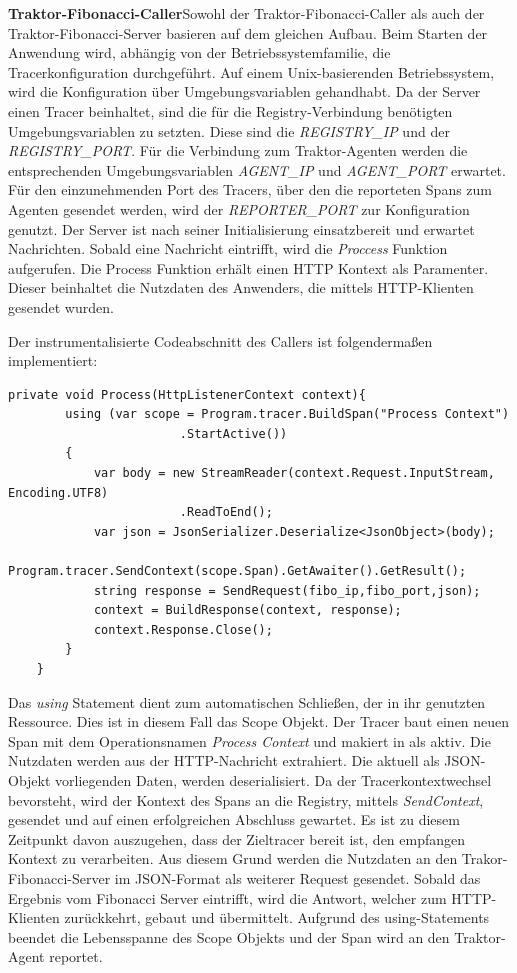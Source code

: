 \textbf{Traktor-Fibonacci-Caller}\space\space\space Sowohl der Traktor-Fibonacci-Caller als auch der Traktor-Fibonacci-Server basieren auf dem gleichen Aufbau. Beim Starten der Anwendung wird, abhängig von der Betriebssystemfamilie, die Tracerkonfiguration durchgeführt. 
Auf einem Unix-basierenden Betriebssystem, wird die Konfiguration über Umgebungsvariablen gehandhabt. 
Da der Server einen Tracer beinhaltet, sind die für die Registry-Verbindung benötigten Umgebungsvariablen zu setzten. 
Diese sind die \emph{REGISTRY\_IP} und der \emph{REGISTRY\_PORT}. 
Für die Verbindung zum Traktor-Agenten werden die entsprechenden Umgebungsvariablen \emph{AGENT\_IP} und \emph{AGENT\_PORT} erwartet.
Für den einzunehmenden Port des Tracers, über den die reporteten Spans zum Agenten gesendet werden, wird der \emph{REPORTER\_PORT} zur Konfiguration genutzt. 
Der Server ist nach seiner Initialisierung einsatzbereit und erwartet Nachrichten. 
Sobald eine Nachricht eintrifft, wird die \emph{Proccess} Funktion aufgerufen. 
Die Process Funktion erhält einen HTTP Kontext als Paramenter. 
Dieser beinhaltet die Nutzdaten des Anwenders, die mittels HTTP-Klienten gesendet wurden.

Der instrumentalisierte Codeabschnitt des Callers ist folgendermaßen implementiert:

\begin{minipage}[]{\textwidth}
	\begin{lstlisting}[frame=trBL]
	private void Process(HttpListenerContext context){
		using (var scope = Program.tracer.BuildSpan("Process Context")
						.StartActive())
		{
			var body = new StreamReader(context.Request.InputStream, Encoding.UTF8)
						.ReadToEnd();       
			var json = JsonSerializer.Deserialize<JsonObject>(body);
			Program.tracer.SendContext(scope.Span).GetAwaiter().GetResult();
			string response = SendRequest(fibo_ip,fibo_port,json);
			context = BuildResponse(context, response);
			context.Response.Close();
		}
	}
	\end{lstlisting}
	\label{listing:Process Funktion des Fibonacci-Caller Services}
\end{minipage}

Das \emph{using} Statement dient zum automatischen Schließen, der in ihr genutzten Ressource. 
Dies ist in diesem Fall das Scope Objekt. 
Der Tracer baut einen neuen Span mit dem Operationsnamen \emph{Process Context} und makiert in als aktiv. 
Die Nutzdaten werden aus der HTTP-Nachricht extrahiert. 
Die aktuell als JSON-Objekt vorliegenden Daten, werden deserialisiert. 
Da der Tracerkontextwechsel bevorsteht, wird der Kontext des Spans an die Registry, mittels \emph{SendContext}, gesendet und auf einen erfolgreichen Abschluss gewartet. 
Es ist zu diesem Zeitpunkt davon auszugehen, dass der Zieltracer bereit ist, den empfangen Kontext zu verarbeiten. 
Aus diesem Grund werden die Nutzdaten an den Trakor-Fibonacci-Server im JSON-Format als weiterer Request gesendet. 
Sobald das Ergebnis vom Fibonacci Server eintrifft, wird die Antwort, welcher zum HTTP-Klienten zurückkehrt, gebaut und übermittelt. 
Aufgrund des using-Statements beendet die Lebensspanne des Scope Objekts und der Span wird an den Traktor-Agent reportet. 

